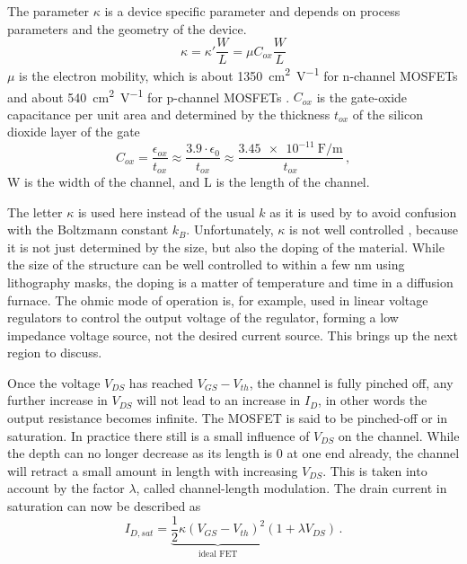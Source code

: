 The parameter $\kappa$ is a device specific parameter and depends on process parameters and the geometry of the device.
\begin{equation}
    \kappa = \kappa' \frac W L = \mu C_{ox} \frac W L
\end{equation}
$\mu$ is the electron mobility, which is about \qty{1350}{\square \cm \per \V} for n-channel MOSFETs and about \qty{540}{\square \cm \per \V} for p-channel MOSFETs \cite{fet_equations}. $C_{ox}$ is the gate-oxide capacitance per unit area and determined by the thickness $t_{ox}$ of the silicon dioxide layer of the gate
\begin{equation}
    C_{ox} = \frac{\epsilon_{ox}}{t_{ox}} \approx \frac{3.9 \cdot \epsilon_{0}}{t_{ox}} \approx \frac{\qty{3.45e-11}{\F \per \m}}{t_{ox}}\,,
\end{equation}
W is the width of the channel, and L is the length of the channel.

The letter $\kappa$ is used here instead of the usual $k$ as it is used by \citeauthor{fet_equations} \cite{fet_equations} to avoid confusion with the Boltzmann constant $k_B$. Unfortunately, $\kappa$ is not well controlled \cite{horowitz1989}, because it is not just determined by the size, but also the doping of the material. While the size of the structure can be well controlled to within a few \unit{\nm} using lithography masks, the doping is a matter of temperature and time in a diffusion furnace. The ohmic mode of operation is, for example, used in linear voltage regulators to control the output voltage of the regulator, forming a low impedance voltage source, not the desired current source. This brings up the next region to discuss.

Once the voltage $V_{DS}$ has reached $V_{GS} - V_{th}$, the channel is fully pinched off, any further increase in $V_{DS}$ will not lead to an increase in $I_D$, in other words the output resistance becomes infinite. The MOSFET is said to be pinched-off or in saturation. In practice there still is a small influence of $V_{DS}$ on the channel. While the depth can no longer decrease as its length is \num{0} at one end already, the channel will retract a small amount in length with increasing $V_{DS}$. This is taken into account by the factor $\lambda$, called channel-length modulation. The drain current in saturation can now be described \cite{shockley_fet_equations} as
\begin{equation}
    I_{D,sat} = \underbrace{\frac 1 2 \kappa \left(V_{GS} - V_{th} \right)^2}_{\text{ideal FET}} (1 + \lambda V_{DS}) \, . \label{eqn:mosfet_saturation}
\end{equation}


